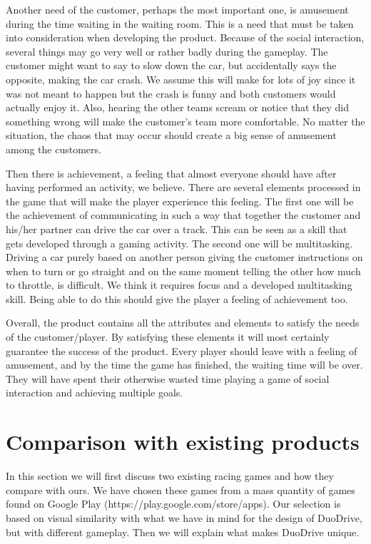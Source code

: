 \documentclass[11pt,twoside,a4paper]{article}
\begin{document}
Another need of the customer, perhaps the most important one, is amusement during the time waiting in the waiting room. This is a need that must be taken into consideration when developing the product. Because of the social interaction, several things may go very well or rather badly during the gameplay. The customer might want to say to slow down the car, but accidentally says the opposite, making the car crash. We assume this will make for lots of joy since it was not meant to happen but the crash is funny and both customers would actually enjoy it. Also, hearing the other teams scream or notice that they did something wrong will make the customer's team more comfortable. No matter the situation, the chaos that may occur should create a big sense of amusement among the customers.

Then there is achievement, a feeling that almost everyone should have after having performed an activity, we believe. There are several elements processed in the game that will make the player experience this feeling. The first one will be the achievement of communicating in such a way that together the customer and his/her partner can drive the car over a track. This can be seen as a skill that gets developed through a gaming activity. The second one will be multitasking. Driving a car purely based on another person giving the customer instructions on when to turn or go straight and on the same moment telling the other how much to throttle, is difficult. We think it requires focus and a developed multitasking skill. Being able to do this should give the player a feeling of achievement too.

Overall, the product contains all the attributes and elements to satisfy the needs of the customer/player. By satisfying these elements it will most certainly guarantee the success of the product. Every player should leave with a feeling of amusement, and by the time the game has finished, the waiting time will be over. They will have spent their otherwise wasted time playing a game of social interaction and achieving multiple goals.


\section{Comparison with existing products}
In this section we will first discuss two existing racing games and how they compare with ours. We have chosen these games from a mass quantity of games found on Google Play (https://play.google.com/store/apps). Our selection is based on visual similarity with what we have in mind for the design of DuoDrive, but with different gameplay. Then we will explain what makes DuoDrive unique.
\end{document}
